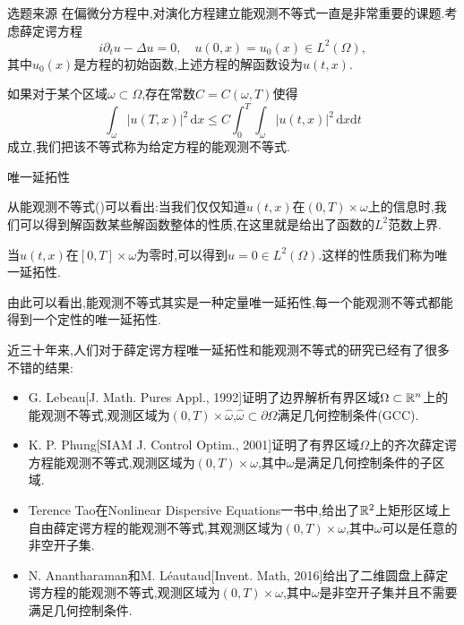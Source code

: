 

\begin{frame}[t]{选题来源}
  在偏微分方程中,对演化方程建立能观测不等式一直是非常重要的课题.考虑薛定谔方程
  \begin{equation}
    i\partial_t u-\Delta u=0,\quad u(0,x)=u_0(x)\in L^2(\Omega),
  \end{equation}
  其中$u_0(x)$是方程的初始函数,上述方程的解函数设为$u(t,x)$.
  
  如果对于某个区域$\omega \subset \Omega$,存在常数$C=C(\omega,T)$使得
  \begin{equation}
    \int_{\omega}|u(T,x)|^2\,\mathrm{d}x\le C \int_0^T\int_{\omega}|u(t,x)|^2\,\mathrm{d}x\mathrm{d}t\label{obs}
  \end{equation}
  成立,我们把该不等式称为给定方程的能观测不等式.
\end{frame}

\begin{frame}[t]{唯一延拓性}
  
  从能观测不等式()可以看出:当我们仅仅知道$u(t,x)$在$(0,T)\times \omega$上的信息时,我们可以得到解函数某些解函数整体的性质,在这里就是给出了函数的$L^2$范数上界.
  
  当$u(t,x)$在$[0,T]\times \omega$为零时,可以得到$u=0\in L^2(\Omega)$.这样的性质我们称为唯一延拓性.

  由此可以看出,能观测不等式其实是一种定量唯一延拓性,每一个能观测不等式都能得到一个定性的唯一延拓性.
\end{frame}

\begin{frame}[t]
  近三十年来,人们对于薛定谔方程唯一延拓性和能观测不等式的研究已经有了很多不错的结果:
  \begin{itemize}
    \item G. Lebeau[J. Math. Pures Appl., 1992]证明了边界解析有界区域$\Omega\subset \mathbb{R}^n$上的能观测不等式,观测区域为$(0,T)\times\hat{\omega}$,$\hat{\omega}\subset \partial \Omega$满足几何控制条件(GCC).
    \item K. P. Phung[SIAM J. Control Optim., 2001]证明了有界区域$\Omega$上的齐次薛定谔方程能观测不等式,观测区域为$(0,T)\times \omega$,其中$\omega$是满足几何控制条件的子区域.
    \item Terence Tao在Nonlinear Dispersive Equations一书中,给出了$\mathbb{R}^2$上矩形区域上自由薛定谔方程的能观测不等式,其观测区域为$(0,T)\times \omega$,其中$\omega$可以是任意的非空开子集.
    \item N. Anantharaman和M. L\'{e}autaud[Invent. Math, 2016]给出了二维圆盘上薛定谔方程的能观测不等式,观测区域为$(0,T)\times \omega$,其中$\omega$是非空开子集并且不需要满足几何控制条件.
  \end{itemize}
\end{frame}


